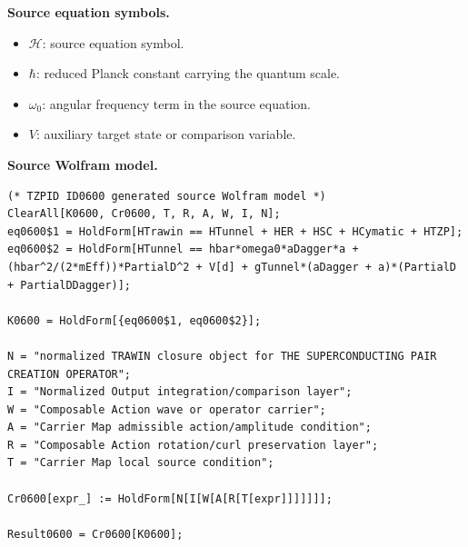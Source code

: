 \begin{minipage}[t]{0.49\linewidth}
\begingroup
\small
\raggedright
\textbf{Source equation symbols.}\par
\begin{itemize}[leftmargin=1.35em,itemsep=1pt,topsep=1pt,parsep=0pt]
    \item $\mathcal{H}$: source equation symbol.
    \item $\hbar$: reduced Planck constant carrying the quantum scale.
    \item $\omega_0$: angular frequency term in the source equation.
    \item $V$: auxiliary target state or comparison variable.
\end{itemize}
\endgroup
\end{minipage}\hfill
\begin{minipage}[t]{0.47\linewidth}
\begingroup
\scriptsize
\raggedright
\textbf{Source Wolfram model.}\par
\begin{Verbatim}[fontsize=\tiny,breaklines=true,breakanywhere=true]
(* TZPID ID0600 generated source Wolfram model *)
ClearAll[K0600, Cr0600, T, R, A, W, I, N];
eq0600$1 = HoldForm[HTrawin == HTunnel + HER + HSC + HCymatic + HTZP];
eq0600$2 = HoldForm[HTunnel == hbar*omega0*aDagger*a + (hbar^2/(2*mEff))*PartialD^2 + V[d] + gTunnel*(aDagger + a)*(PartialD + PartialDDagger)];

K0600 = HoldForm[{eq0600$1, eq0600$2}];

N = "normalized TRAWIN closure object for THE SUPERCONDUCTING PAIR CREATION OPERATOR";
I = "Normalized Output integration/comparison layer";
W = "Composable Action wave or operator carrier";
A = "Carrier Map admissible action/amplitude condition";
R = "Composable Action rotation/curl preservation layer";
T = "Carrier Map local source condition";

Cr0600[expr_] := HoldForm[N[I[W[A[R[T[expr]]]]]]];

Result0600 = Cr0600[K0600];
\end{Verbatim}
\endgroup
\end{minipage}

